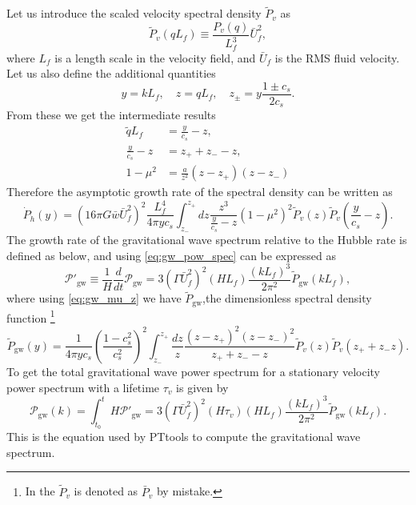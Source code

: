 Let us introduce the scaled velocity spectral density $\tilde{P}_v$ as
\begin{equation}
\tilde{P}_v(qL_f) \equiv \frac{P_v(q)}{L_f^3} \bar{U}_f^2,
\label{eq:tilde_p_v}
\end{equation}
where $L_f$ is a length scale in the velocity field, and $\bar{U}_f$ is the RMS fluid velocity.
Let us also define the additional quantities
\begin{equation}
y = kL_f, \quad z = qL_f, \quad z_\pm = y \frac{1 \pm c_s}{2 c_s}.
\label{eq:gw_yz}
\end{equation}
From these we get the intermediate results
\begin{align}
\tilde{q}L_f &= \frac{y}{c_s} - z, \\
\frac{y}{c_s} - z &= z_+ + z_- - z, \\
1 - \mu^2 &= \frac{a}{z^2}(z-z_+)(z-z_-)
\label{eq:gw_mu_z}
\end{align}
Therefore the asymptotic growth rate of the spectral density can be written as
\begin{equation}
\dot{P}_{\dot{h}}(y) =
\left( 16 \pi G \bar{w} \bar{U}_f^2 \right)^2
\frac{L_f^4}{4 \pi y c_s}
\int_{z_-}^{z_+} dz
\frac{z^3}{\frac{y}{c_s} - z}
(1 - \mu^2)^2
\tilde{P}_v (z) \tilde{P}_v \left( \frac{y}{c_s} - z \right).
\end{equation}
The growth rate of the gravitational wave spectrum relative to the Hubble rate is defined as below,
and using \eqref{eq:gw_pow_spec} can be expressed as
\cite[eq. 3.46]{hindmarsh_gw_pt_2019}
\begin{equation}
\mathcal{P}'_{\text{gw}} \equiv \frac{1}{H} \frac{d}{dt} \mathcal{P}_{\text{gw}}
= 3 \left( \Gamma \bar{U}_f^2 \right)^2 (HL_f) \frac{(kL_f)^3}{2 \pi^2} \tilde{P}_{\text{gw}} (kL_f),
\label{eq:pow_gw_prime}
\end{equation}
where using \eqref{eq:gw_mu_z} we have $\tilde{P}_{\text{gw}}$,the dimensionless spectral density function
\cite[eq. 3.47]{hindmarsh_gw_pt_2019}
\footnote{In \cite{hindmarsh_gw_pt_2019} the $\tilde{P}_v$ is denoted as $\bar{P}_v$ by mistake.}
\begin{equation}
\tilde{P}_\text{gw} (y) = \frac{1}{4\pi yc_s} \left(\frac{1-c_s^2}{c_s^2}\right)^2
\int_{z_-}^{z_+} \frac{dz}{z}
\frac{(z-z_+)^2(z-z_-)^2}{z_+ + z_- - z}
\tilde{P}_v (z) \tilde{P}_v (z_+ + z_- z).
\label{eq:spectral_density}
\end{equation}
To get the total gravitational wave power spectrum for a stationary velocity power spectrum with a lifetime $\tau_v$ is given by
\begin{equation}
\mathcal{P}_\text{gw}(k)
= \int_{t_0}^{t} H \mathcal{P}'_\text{gw}
= 3 \left( \Gamma \bar{U}_f^2 \right)^2 (H \tau_v)(H L_f) \frac{(kL_f)^3}{2\pi^2} \tilde{P}_\text{gw} (kL_f).
\label{eq:pow_gw}
\end{equation}
This is the equation used by PTtools to compute the gravitational wave spectrum.

